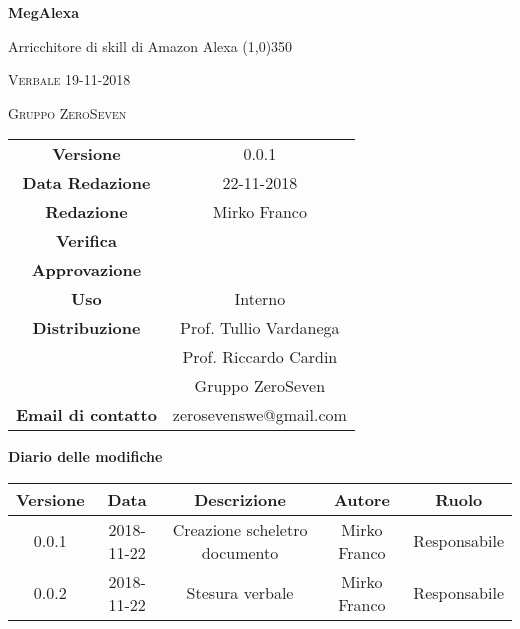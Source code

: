 \documentclass[a4paper,12pt]{article}
\author{Mirko Franco}
\date{26-11-2018}
\begin{document}
\begin{titlepage}
	\centering
	{\huge\bfseries MegAlexa\par}
	Arricchitore di skill di Amazon Alexa
	\line(1,0){350} \\
	{\scshape\LARGE Verbale 19-11-2018 \par}
	\vspace{1cm}
	{\scshape Gruppo ZeroSeven \par}
	\logo
	\begin{tabular}{c|c}
		{\hfill \textbf{Versione}} 			& 0.0.1				\\
		{\hfill\textbf{Data Redazione}} 	& 22-11-2018		\\ 
		{\hfill\textbf{Redazione}} 			&  		Mirko Franco			\\ 
		{\hfill\textbf{Verifica}} 				&  				\\ 
		{\hfill\textbf{Approvazione}} 		&  			\\ 
		{\hfill\textbf{Uso}} 					& 	Interno	\\ 
		{\hfill\textbf{Distribuzione}} 			& 			Prof. Tullio Vardanega \\ & Prof. Riccardo Cardin \\ & Gruppo ZeroSeven		\\ 
		{\hfill\textbf{Email di contatto}} & zerosevenswe@gmail.com \\
	\end{tabular}
\end{titlepage}
	

	
	\label{LastFrontPage}
	

	\newpage
	\cleardoublepage
	\begin{center}
		\textbf{Diario delle modifiche}
	\end{center}
	\begin{center}
		\begin{tabular}{|c|c|c|c|c|}
			\hline
			\textbf{Versione} & \textbf{Data} & \textbf{Descrizione} & \textbf{Autore} & \textbf{Ruolo} \\
			\hline
			0.0.1 & 2018-11-22 & Creazione scheletro documento & Mirko Franco & Responsabile\\
			\hline
			0.0.2 & 2018-11-22 & Stesura verbale & Mirko Franco & Responsabile \\
			\hline
		\end{tabular}
	\end{center}
	
	\cleardoublepage
	\pagestyle{mymain}
	
\end{document}

